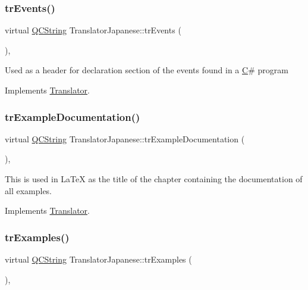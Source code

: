 \subsubsection{\texorpdfstring{trEvents()}{trEvents()}}
{\footnotesize\ttfamily virtual \mbox{\hyperlink{class_q_c_string}{Q\+C\+String}} Translator\+Japanese\+::tr\+Events (\begin{DoxyParamCaption}{ }\end{DoxyParamCaption})\hspace{0.3cm}{\ttfamily [inline]}, {\ttfamily [virtual]}}

Used as a header for declaration section of the events found in a \mbox{\hyperlink{class_c}{C}}\# program 

Implements \mbox{\hyperlink{class_translator}{Translator}}.

\mbox{\label{class_translator_japanese_af9f10fc778f95f99edd3dec625eb66ae}} 
\subsubsection{\texorpdfstring{trExampleDocumentation()}{trExampleDocumentation()}}
{\footnotesize\ttfamily virtual \mbox{\hyperlink{class_q_c_string}{Q\+C\+String}} Translator\+Japanese\+::tr\+Example\+Documentation (\begin{DoxyParamCaption}{ }\end{DoxyParamCaption})\hspace{0.3cm}{\ttfamily [inline]}, {\ttfamily [virtual]}}

This is used in La\+TeX as the title of the chapter containing the documentation of all examples. 

Implements \mbox{\hyperlink{class_translator}{Translator}}.

\mbox{\label{class_translator_japanese_a9156009f1d3b6509fea32f5da43ffd66}} 
\subsubsection{\texorpdfstring{trExamples()}{trExamples()}}
{\footnotesize\ttfamily virtual \mbox{\hyperlink{class_q_c_string}{Q\+C\+String}} Translator\+Japanese\+::tr\+Examples (\begin{DoxyParamCaption}{ }\end{DoxyParamCaption})\hspace{0.3cm}{\ttfamily [inline]}, {\ttfamily [virtual]}}

